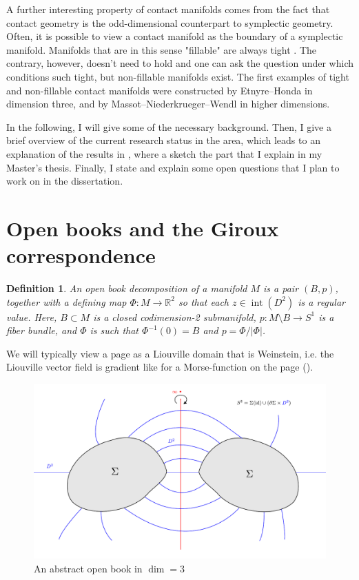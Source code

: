 \documentclass{amsart}
\newtheorem{definition}{Definition}
\begin{document}
A further interesting property of contact manifolds comes from the fact that contact geometry is the odd-dimensional counterpart to symplectic geometry. Often, it is possible to view a contact manifold as the boundary of a symplectic manifold. Manifolds that are in this sense "fillable" are always tight \cite{Gromov85,Eliashberg91}.
The contrary, however, doesn't need to hold and one can ask the question under which conditions such tight, but non-fillable manifolds exist. The first examples of tight and non-fillable contact manifolds were constructed by Etnyre--Honda \cite{EH02} in dimension three, and by Massot--Niederkrueger--Wendl \cite{MNW13} in higher dimensions.


In the following, I will give some of the necessary background.
Then, I give a brief overview of the current research status in the area, which leads
to an explanation of the results in \cite{BGMZ22}, where a sketch the part
that I explain in my Master's thesis. 
Finally, I state and explain some open questions that I plan to work on in the dissertation.

\section*{Open books and the Giroux correspondence}
\begin{definition}
    An open book decomposition of a manifold $M$ is a pair $(B, p)$, together with a defining map $\Phi:M \to \mathbb R^2$ so that each $z \in \operatorname{int}(D^2)$ is a regular value.
    Here, $B \subset M$ is a closed codimension-2 submanifold, $p: M\setminus B \to S^1$ is a fiber bundle, and $\Phi$ is such that $\Phi^{-1}(0) = B$ and $p =  \Phi / |\Phi|$.
\end{definition}
We will typically view a page as a Liouville domain that is Weinstein, i.e. the Liouville vector field is gradient like for a Morse-function on the page (\cite[Def 1.1.2]{BHH23}).


\begin{figure}
    \includegraphics*[width=\textwidth]{../document/images/abstract_open_book.pdf}
    \caption{An abstract open book in $\dim = 3$}
    \label{fig:abstract_open_book}
\end{figure}
\end{document}
